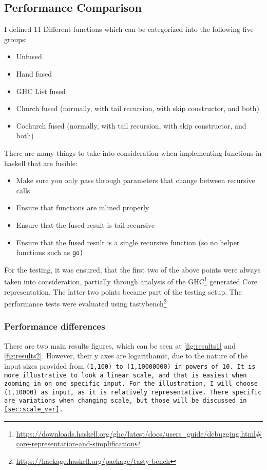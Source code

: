 \subsection{Performance Comparison}
I defined 11 Different functions which can be categorized into the following five groups:
\begin{itemize}[noitemsep]
\item Unfused
\item Hand fused
\item GHC List fused
\item Church fused (normally, with tail recursion, with skip constructor, and both)
\item Cochurch fused (normally, with tail recursion, with skip constructor, and both)
\end{itemize}

There are many things to take into consideration when implementing functions in haskell that are fusible:
\begin{itemize}[noitemsep]
    \item Make sure you only pass through parameters that change between recursive calls
    \item Ensure that functions are inlined properly
    \item Ensure that the fused result is tail recursive
    \item Ensure that the fused result is a single recursive function (so no helper functions such as \tt{go})
\end{itemize}

For the testing, it was ensured, that the first two of the above points were always taken into consideration, partially through analysis of the GHC\footnote{\url{https://downloads.haskell.org/ghc/latest/docs/users_guide/debugging.html\#core-representation-and-simplification}} generated Core representation.
The latter two points became part of the testing setup.
The performance tests were evaluated using tastybench\footnote{\url{https://hackage.haskell.org/package/tasty-bench}}

\subsubsection{Performance differences}
There are two main results figures, which can be seen at \autoref{fig:results1} and \autoref{fig:results2}.
However, their y axes are logarithamic, due to the nature of the input sizes provided from \tt{(1,100)} to \tt{(1,10000000)} in powers of 10.
It is more illustrative to look a linear scale, and that is easiest when zooming in on one specific input.
For the illustration, I will choose \tt{(1,10000)} as input, as it is relatively representative. There specific are variations when changing scale, but those will be discussed in \autoref{sec:scale_var}.

